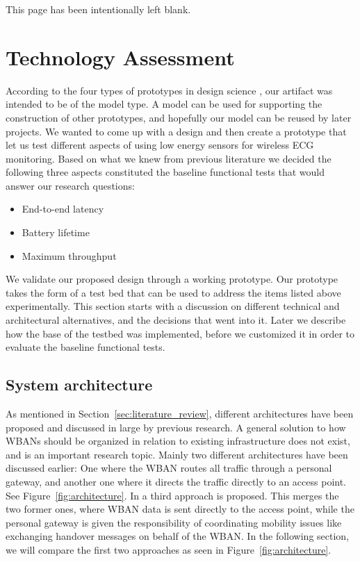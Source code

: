\newpage
\thispagestyle{empty}
This page has been intentionally left blank.

\newpage


\section{Technology Assessment} %
\label{sec:technology_assessment}

According to the four types of prototypes in design science \cite{Johannesson:2014co}, our artifact was intended to be of the model type. A model can be used for supporting the construction of other prototypes, and hopefully our model can be reused by later projects. We wanted to come up with a design and then create a prototype that let us test different aspects of using low energy sensors for wireless ECG monitoring. Based on what we knew from previous literature we decided the following three aspects constituted the baseline functional tests that would answer our research questions:
\begin{itemize}
	
	\item End-to-end latency
	\item Battery lifetime
	\item Maximum throughput
  
\end{itemize}
\noindent
We validate our proposed design through a working prototype. Our prototype takes the form of a test bed that can be used to address the items listed above experimentally. This section starts with a discussion on different technical and architectural alternatives, and the decisions that went into it. Later we describe how the base of the testbed was implemented, before we customized it in order to evaluate the baseline functional tests.

\subsection{System architecture} %
\label{sub:system_architecture}

As mentioned in Section~\ref{sec:literature_review}, different architectures have been proposed and discussed in large by previous research. A general solution to how WBANs should be organized in relation to existing infrastructure does not exist, and is an important research topic. Mainly two different architectures have been discussed earlier: One where the WBAN routes all traffic through a personal gateway, and another one where it directs the traffic directly to an access point. See Figure~\ref{fig:architecture}. In \cite{Shahamabadi:2013df} a third approach is proposed. This merges the two former ones, where WBAN data is sent directly to the access point, while the personal gateway is given the responsibility of coordinating mobility issues like exchanging handover messages on behalf of the WBAN. In the following section, we will compare the first two approaches as seen in Figure~\ref{fig:architecture}.

